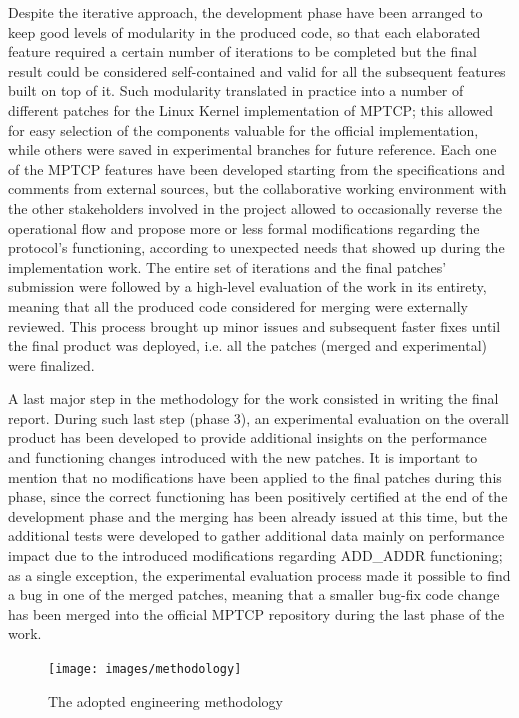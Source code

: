 Despite the iterative approach, the development phase have been arranged to keep good levels of modularity in the produced code, so that each elaborated feature required a certain number of iterations to be completed but the final result could be considered self-contained and valid for all the subsequent features built on top of it. 
Such modularity translated in practice into a number of different patches for the Linux Kernel implementation of MPTCP; this allowed for easy selection of the components valuable for the official implementation, while others were saved in experimental branches for future reference.
Each one of the MPTCP features have been developed starting from the specifications and comments from external sources, but the collaborative working environment with the other stakeholders involved in the project allowed to occasionally reverse the operational flow and propose more or less formal modifications regarding the protocol's functioning, according to unexpected needs that showed up during the implementation work.
The entire set of iterations and the final patches' submission were followed by a high-level evaluation of the work in its entirety, meaning that all the produced code considered for merging were externally reviewed. This process brought up minor issues and subsequent faster fixes until the final product was deployed, i.e. all the patches (merged and experimental) were finalized. 

A last major step in the methodology for the work consisted in writing the final report. During such last step (phase 3), an experimental evaluation on the overall product has been developed to provide additional insights on the performance and functioning changes introduced with the new patches. It is important to mention that no modifications have been applied to the final patches during this phase, since the correct functioning has been positively certified at the end of the development phase and the merging has been already issued at this time, but the additional tests were developed to gather additional data mainly on performance impact due to the introduced modifications regarding ADD\_ADDR functioning; as a single exception, the experimental evaluation process made it possible to find a bug in one of the merged patches, meaning that a smaller bug-fix code change has been merged into the official MPTCP repository during the last phase of the work.

\begin{figure}[!htb]
\centering
\texttt{[image: images/methodology]}
\caption{The adopted engineering methodology}
\label{fig:methodology}
\end{figure}

